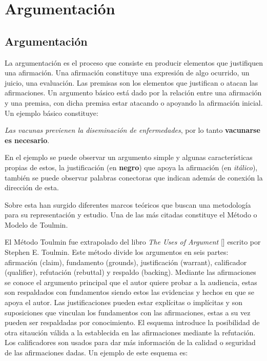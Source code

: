 \chapter{Argumentación}\label{chapter:argumentation}


\section{Argumentación}


La argumentación es el proceso que consiste en producir elementos que justifiquen una afirmación. Una afirmación 
constituye una expresión de algo ocurrido, un juicio, una evaluación. Las premisas son los elementos que 
justifican o atacan las afirmaciones. Un argumento básico está dado por la relación entre una afirmación y una 
premisa, con dicha premisa estar atacando o apoyando la afirmación inicial. Un ejemplo básico constituye:

\begin{adjustwidth}{25pt}{25pt}
    \emph{Las vacunas previenen la diseminación de enfermedades}, por lo tanto \textbf{vacunarse es necesario}.
\end{adjustwidth}

En el ejemplo se puede observar un argumento simple y algunas características propias de estos, la justificación 
(en \textbf{negro}) que apoya la afirmación (en \emph{itálico}), también se puede observar palabras conectoras 
que indican además de conexión la dirección de esta.

Sobre esta han surgido diferentes marcos teóricos que buscan una metodología para su representación y estudio. 
Una de las más citadas constituye el Método o Modelo de Toulmin.

El Método Toulmin fue extrapolado del libro \emph{The Uses of Argument} [\cite{toulmin_2003}] escrito por Stephen E. Toulmin.
Este método divide los argumentos en seis partes: afirmación (claim), fundamento (grounds), 
justificación (warrant), calificador (qualifier), refutación (rebuttal) y respaldo (backing).
Mediante las afirmaciones se conoce el argumento principal que el autor quiere probar a la audiencia,
estas son respaldados con fundamentos siendo estos las evidencias y hechos en que se apoya el autor.
Las justificaciones pueden estar explícitas o implícitas y son suposiciones que vinculan los
fundamentos con las afirmaciones, estas a su vez pueden ser respaldadas por conocimiento.
El esquema introduce la posibilidad de otra sitaución válida a la establecida en las afirmaciones
mediante la refutación. Los calificadores son usados para dar más información de la calidad o seguridad
de las afirmaciones dadas. Un ejemplo de este esquema es:

